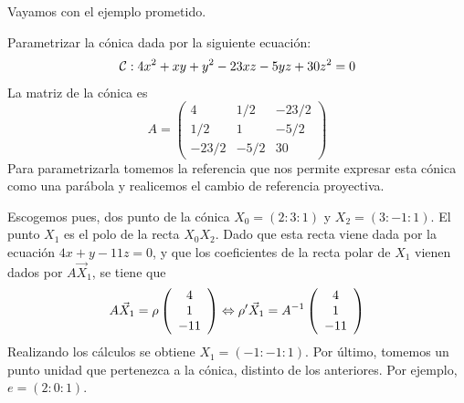 Vayamos con el ejemplo prometido.
\begin{exa}\label{C8_exa_parametrizacion_parabola}
	Parametrizar la cónica dada por la siguiente ecuación:
	\begin{equation}
		\mathcal{C}:4x^2+xy+y^2-23xz-5yz+30z^2=0
	\end{equation}
	La matriz de la cónica es 
	\begin{equation*}
	A=\left( \begin{array}{rrr}
	4& 1/2 & -23/2\\
	 1/2 & 1 & -5/2\\
	-23/2 & -5/2 & 30
	\end{array}\right) 
	\end{equation*}
	Para parametrizarla tomemos la referencia que nos permite expresar esta cónica como una parábola y realicemos el cambio de referencia proyectiva.
	
	Escogemos pues, dos punto de la cónica $X_0=(2:3:1)$ y $X_2=(3:-1:1)$. El punto $X_1$ es el polo de la recta $X_0X_2$. Dado que esta recta viene dada por la ecuación $4x+y-11z=0$, y que los coeficientes de la recta polar de $X_1$ vienen dados por $A\vec{X}_1$, se tiene que
	\begin{equation*}
		A\vec{X}_1=\rho \left( \begin{array}{c}
		4\\1\\-11
		\end{array}\right)\Leftrightarrow \rho'\vec{X}_1=A^{-1}
		\left( \begin{array}{c}
			4\\1\\-11
		\end{array}\right)
	\end{equation*}
	Realizando los cálculos se obtiene $X_1=(-1:-1:1)$. Por último, tomemos un punto unidad que pertenezca a la cónica, distinto de los anteriores. Por ejemplo, $e=(2:0:1)$.
	

\end{exa}
